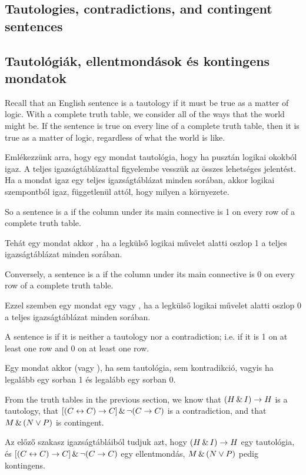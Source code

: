\subsection*{Tautologies, contradictions, and contingent sentences}
\subsection{Tautológiák, ellentmondások és kontingens mondatok}
Recall that an English sentence is a tautology if it must be true as a matter of logic. With a complete truth table, we consider all of the ways that the world might be. If the sentence is true on every line of a complete truth table, then it is true as a matter of logic, regardless of what the world is like.

Emlékezzünk arra, hogy egy mondat tautológia, hogy ha pusztán logikai okokból igaz. A teljes igazságtáblázattal figyelembe vesszük az összes lehetséges jelentést. Ha a mondat igaz egy teljes igazságtáblázat minden sorában, akkor logikai szempontból igaz, függetlenül attól, hogy milyen a környezete.

So a sentence is a  if the column under its main connective is 1 on every row of a complete truth table.

Tehát egy mondat akkor , ha a legkülső logikai művelet alatti oszlop 1 a teljes igazságtáblázat minden sorában.

Conversely, a sentence is a  if the column under its main connective is 0 on every row of a complete truth table.

Ezzel szemben egy mondat egy  vagy , ha a legkülső logikai művelet alatti oszlop 0 a teljes igazságtáblázat minden sorában.

A sentence is  if it is neither a tautology nor a contradiction; i.e. if it is 1 on at least one row and 0 on at least one row.

Egy mondat akkor  (vagy ), ha sem tautológia, sem kontradikció, vagyis ha legalább egy sorban 1 és legalább egy sorban 0.

From the truth tables in the previous section, we know that $(H\,\&\, I)\rightarrow H$ is a tautology, that $[(C\leftrightarrow C) \rightarrow C] \,\&\, \neg(C \rightarrow C)$ is a contradiction, and that $M \,\&\, (N \vee P)$ is contingent.


Az előző szakasz igazságtábláiból tudjuk azt, hogy $(H\,\&\, I)\rightarrow H$ egy tautológia, és $[(C\leftrightarrow C) \rightarrow C] \,\&\, \neg(C \rightarrow C)$ egy ellentmondás,  $M \,\&\, (N \vee P)$ pedig kontingens.

